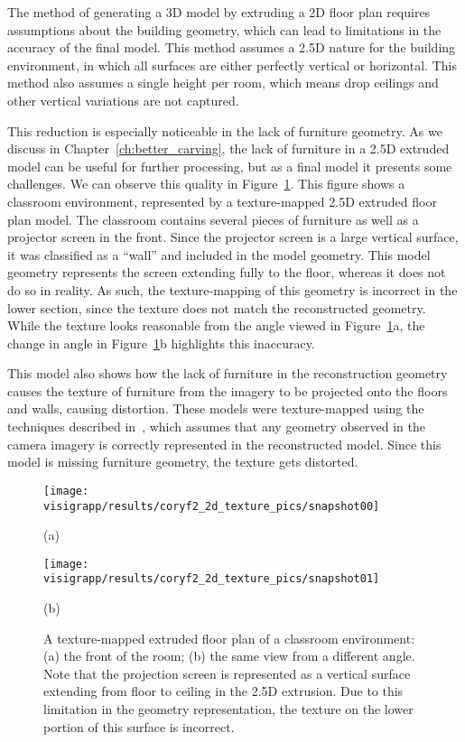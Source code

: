 \documentclass[12pt,onecolumn,oneside]{book}
\begin{document}
The method of generating a 3D model by extruding a 2D floor plan requires assumptions about the building geometry, which can lead to limitations in the accuracy of the final model.  This method assumes a 2.5D nature for the building environment, in which all surfaces are either perfectly vertical or horizontal.  This method also assumes a single height per room, which means drop ceilings and other vertical variations are not captured.

This reduction is especially noticeable in the lack of furniture geometry.  As we discuss in Chapter~\ref{ch:better_carving}, the lack of furniture in a 2.5D extruded model can be useful for further processing, but as a final model it presents some challenges.  We can observe this quality in Figure~\ref{fig:cory299_texture}.  This figure shows a classroom environment, represented by a texture-mapped 2.5D extruded floor plan model.  The classroom contains several pieces of furniture as well as a projector screen in the front.  Since the projector screen is a large vertical surface, it was classified as a ``wall'' and included in the model geometry.  This model geometry represents the screen extending fully to the floor, whereas it does not do so in reality.  As such, the texture-mapping of this geometry is incorrect in the lower section, since the texture does not match the reconstructed geometry.  While the texture looks reasonable from the angle viewed in Figure~\ref{fig:cory299_texture}a, the change in angle in Figure~\ref{fig:cory299_texture}b highlights this inaccuracy.  

This model also shows how the lack of furniture in the reconstruction geometry causes the texture of furniture from the imagery to be projected onto the floors and walls, causing distortion.  These models were texture-mapped using the techniques described in~\cite{Cheng14}, which assumes that any geometry observed in the camera imagery is correctly represented in the reconstructed model.  Since this model is missing furniture geometry, the texture gets distorted. 

\begin{figure}[H]
   \centering
   \begin{minipage}[b]{0.49\linewidth}
   \texttt{[image: visigrapp/results/coryf2\_2d\_texture\_pics/snapshot00]}
   \centerline{(a)}
   \end{minipage}
   \hfill
   \begin{minipage}[b]{0.49\linewidth}
   \texttt{[image: visigrapp/results/coryf2\_2d\_texture\_pics/snapshot01]}
   \centerline{(b)}
   \end{minipage}

   \caption[Limitations of 2.5D models.]{A texture-mapped extruded floor plan of a classroom environment: (a) the front of the room; (b) the same view from a different angle.  Note that the projection screen is represented as a vertical surface extending from floor to ceiling in the 2.5D extrusion.  Due to this limitation in the geometry representation, the texture on the lower portion of this surface is incorrect.
   \protect
   \label{fig:cory299_texture}}
\end{figure}
\end{document}
